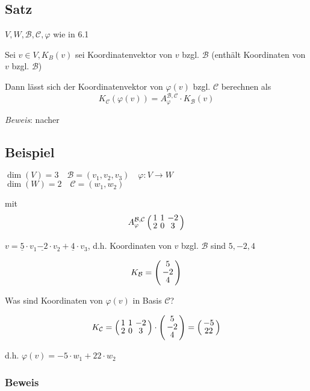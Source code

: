 \subsection{Satz}

$V,W,\mathcal{B},\mathcal{C},\varphi$ wie in 6.1\bigskip

Sei $v \in V,K_B(v)$ sei Koordinatenvektor von $v$ bzgl. $\mathcal{B}$ (enthält Koordinaten von $v$ bzgl. $\mathcal{B}$)

Dann lässt sich der Koordinatenvektor von $\varphi(v)$ bzgl. $\mathcal{C}$ berechnen als
\[K_\mathcal{C}(\varphi(v)) = A_\varphi^{\mathcal{B},\mathcal{C}} \cdot K_\mathcal{B}(v)\]

\emph{Beweis}: nacher

\subsection{Beispiel}

$\dim(V) = 3 \quad \mathcal{B} = (v_1,v_2,v_3) \quad \varphi: V \rightarrow W$\\
$\dim(W) = 2 \quad \mathcal{C} = (w_1,w_2)$

mit
\[A_\varphi^{\mathcal{B},\mathcal{C}} \aMatrix{ccc}{1 & 1 & -2 \\ 2 & 0 & 3}\]

$v = \underline{5}\cdot v_1 \underline{-2} \cdot v_2 +\underline{4} \cdot v_3$, d.h. Koordinaten von $v$ bzgl. $\mathcal{B}$ sind $5,-2,4$

\[K_\mathcal{B} =
\aMatrix{c}
{5\\-2\\4}
\]

Was sind Koordinaten von $\varphi(v)$ in Basis $\mathcal{C}$?

\[
K_\mathcal{C} = \aMatrix{ccc}{1 & 1 & -2 \\ 2 & 0 & 3}\cdot
\aMatrix{c}{5\\-2\\4}= \weirdvct{-5}{22}
\]

d.h. $\varphi(v) = -5 \cdot w_1 + 22 \cdot w_2$\bigskip

\subsubsection*{Beweis}

